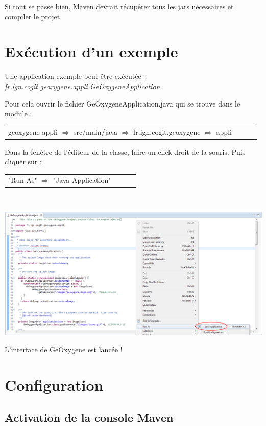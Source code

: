 \bigskip
\noindent
Si tout se passe bien, Maven devrait récupérer tous les jars nécessaires et compiler le projet. 

\section{Exécution d'un exemple}
Une application exemple peut \^etre exécutée~: \emph{fr.ign.cogit.geoxygene.appli.GeOxygeneApplication}.

\bigskip

\noindent
Pour cela ouvrir le fichier GeOxygeneApplication.java qui se trouve dans le module : \\
\begin{tabular}[!t]{llll}
   geoxygene-appli $\Rightarrow$ src/main/java $\Rightarrow$  fr.ign.cogit.geoxygene $\Rightarrow$ appli
\end{tabular}

\bigskip

\noindent
Dans la fenêtre de l'éditeur de la classe, faire un click droit de la souris. Puis cliquer sur :\\
\begin{tabular}[!t]{llll}
"Run As" $\Rightarrow$ "Java Application"
\end{tabular}\\

\begin{center}
\includegraphics[width=0.5\linewidth]{../../resources/images/guide_installation/GeOxygeneAppliRunAs.png}
\end{center}

L'interface de GeOxygene est lancée !


\section{Configuration}


\subsection{Activation de la console Maven}

